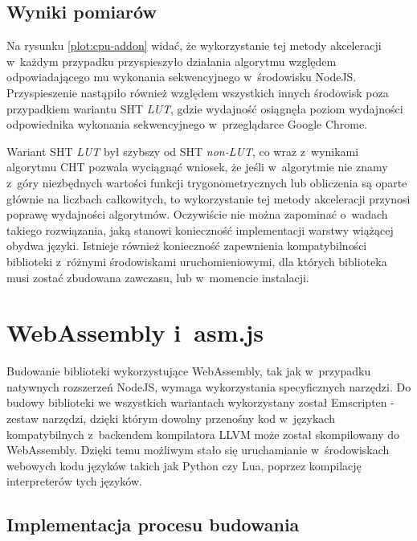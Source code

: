 

\subsection{Wyniki pomiarów}

Na rysunku \ref{plot:cpu-addon} widać, że wykorzystanie tej metody akceleracji w~każdym przypadku przyspieszyło działania algorytmu względem odpowiadającego mu wykonania sekwencyjnego w~środowisku NodeJS. Przyspieszenie nastąpiło również względem wszystkich innych środowisk poza przypadkiem wariantu SHT \textit{LUT}, gdzie wydajność osiągnęła poziom wydajności odpowiednika wykonania sekwencyjnego w~przeglądarce Google Chrome.

Wariant SHT \textit{LUT} był  szybszy od SHT \textit{non-LUT}, co wraz z~wynikami algorytmu CHT pozwala wyciągnąć wniosek, że jeśli w~algorytmie nie znamy z~góry niezbędnych wartości funkcji trygonometrycznych lub obliczenia są oparte głównie na liczbach całkowitych, to wykorzystanie tej metody akceleracji przynosi poprawę wydajności algorytmów. Oczywiście nie można zapominać o~wadach takiego rozwiązania, jaką stanowi konieczność implementacji warstwy wiążącej obydwa języki. Istnieje również konieczność zapewnienia kompatybilności biblioteki z~różnymi środowiskami uruchomieniowymi, dla których biblioteka musi zostać zbudowana zawczasu, lub w~momencie instalacji.

\section{WebAssembly i~asm.js}

Budowanie biblioteki wykorzystujące WebAssembly, tak jak w~przypadku natywnych rozszerzeń NodeJS, wymaga wykorzystania specyficznych narzędzi. Do budowy biblioteki we wszystkich wariantach wykorzystany został Emscripten \cite{emscripten} - zestaw narzędzi, dzięki którym dowolny przenośny kod w~językach kompatybilnych z~backendem kompilatora LLVM może został skompilowany do WebAssembly. Dzięki temu możliwym stało się uruchamianie w~środowiskach webowych kodu języków takich jak Python czy Lua, poprzez kompilację interpreterów tych języków.

\subsection{Implementacja procesu budowania}

